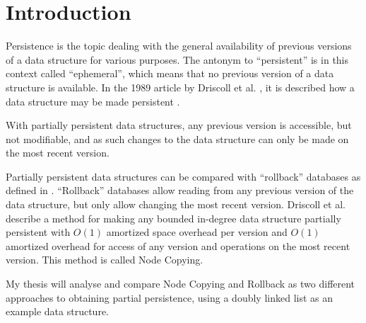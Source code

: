 \chapter{Introduction}
Persistence is the topic dealing with the general availability of previous
versions of a data structure for various purposes. The antonym to ``persistent''
is in this context called ``ephemeral'', which means that no previous version of
a data structure is available. In the 1989 article by Driscoll et al.
\cite{Driscoll198986}, it is described how a data structure may be made
persistent%
.

With partially persistent data structures, any previous version is accessible,
but not modifiable, and as such changes to the data structure can only be made
on the most recent version.


Partially persistent data structures can be compared with ``rollback'' databases
as defined in \cite{10.1109/AFIPS.1987.11}. ``Rollback'' databases allow reading
from any previous version of the data structure, but only allow changing the
most recent version. Driscoll et al. describe a method for making any bounded
in-degree data structure partially persistent with $O(1)$ amortized space
overhead per version and $O(1)$ amortized overhead for access of any version and
operations on the most recent version. This method is called Node Copying.

My thesis will analyse and compare Node Copying and Rollback as two different
approaches to obtaining partial persistence, using a doubly linked list as an
example data structure.

% 
% 

